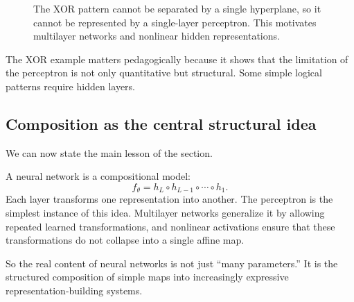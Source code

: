 \begin{figure}[tbp]
\centering
{}
\caption{The XOR pattern cannot be separated by a single hyperplane, so it cannot be represented by a single-layer perceptron. This motivates multilayer networks and nonlinear hidden representations.}
\end{figure}

The XOR example matters pedagogically because it shows that the limitation of the perceptron is not only quantitative but structural. Some simple logical patterns require hidden layers.

\subsection*{Composition as the central structural idea}

We can now state the main lesson of the section.

A neural network is a compositional model:
\[
f_\theta
=
h_L \circ h_{L-1} \circ \cdots \circ h_1.
\]
Each layer transforms one representation into another. The perceptron is the simplest instance of this idea. Multilayer networks generalize it by allowing repeated learned transformations, and nonlinear activations ensure that these transformations do not collapse into a single affine map.

So the real content of neural networks is not just “many parameters.” It is the structured composition of simple maps into increasingly expressive representation-building systems.



